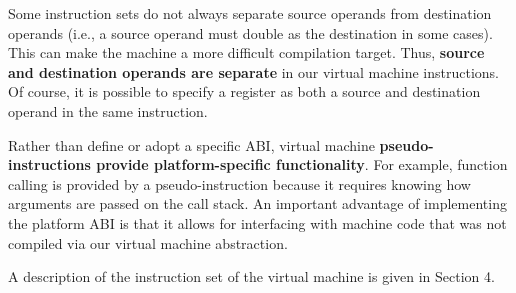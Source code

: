 Some instruction sets do not always separate source operands from
destination operands (i.e., a source operand must double as the destination
in some cases).
This can make the machine a more difficult compilation target.
Thus, \textbf{source and destination operands are separate} in our
virtual machine instructions.
Of course, it is possible to specify a register as both a source
and destination operand in the same instruction.

Rather than define or adopt a specific ABI, virtual machine \textbf{pseudo-instructions
provide platform-specific functionality}.
For example, function calling is provided by a pseudo-instruction because
it requires knowing how arguments are passed on the call stack.
An important advantage of implementing the platform ABI is that it allows for interfacing
with machine code that was not compiled via our virtual machine abstraction.

A description of the instruction set of the virtual machine
is given in Section 4.
